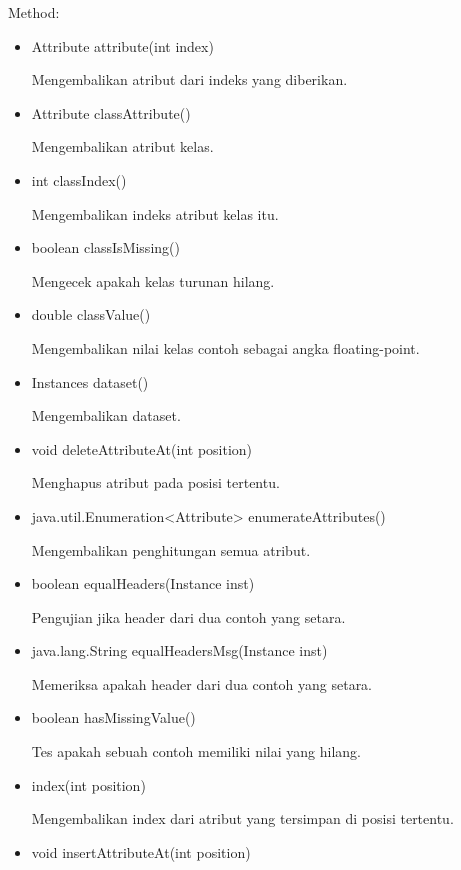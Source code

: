 Method:
\begin{itemize}
	\item Attribute attribute(int index)
	
	Mengembalikan atribut dari indeks yang diberikan.
	
	\item Attribute classAttribute()
	
	Mengembalikan atribut kelas.
	
	\item int classIndex()
	
	Mengembalikan indeks atribut kelas itu.
	
	\item boolean classIsMissing()
	
	Mengecek apakah kelas turunan hilang.
	
	\item double classValue()
	
	Mengembalikan nilai kelas contoh sebagai angka floating-point.
	
	\item Instances dataset()
	
	Mengembalikan dataset.
	
	\item void deleteAttributeAt(int position)
	
	Menghapus atribut pada posisi tertentu.
	
	\item java.util.Enumeration<Attribute> enumerateAttributes()
	
	Mengembalikan penghitungan semua atribut.
	
	\item boolean equalHeaders(Instance inst)
	
	Pengujian jika header dari dua contoh yang setara.
	
	\item java.lang.String equalHeadersMsg(Instance inst)
	
	Memeriksa apakah header dari dua contoh yang setara.
	
	\item boolean hasMissingValue()
	
	Tes apakah sebuah contoh memiliki nilai yang hilang.
	
	\item index(int position)
	
	Mengembalikan index dari atribut yang tersimpan di posisi tertentu.
	
	\item void insertAttributeAt(int position)
	

\end{itemize}
